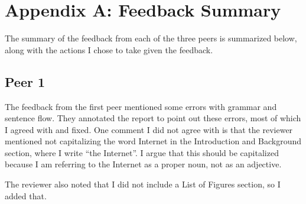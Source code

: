 \section*{Appendix A: Feedback Summary}
The summary of the feedback from each of the three peers is summarized below, along with the actions I chose to take given the feedback.

\subsection*{Peer 1}
The feedback from the first peer mentioned some errors with grammar and sentence flow.
They annotated the report to point out these errors, most of which I agreed with and fixed.
One comment I did not agree with is that the reviewer mentioned not capitalizing the word Internet in the Introduction and Background section, where I write ``the Internet''.
I argue that this should be capitalized because I am referring to the Internet as a proper noun, not as an adjective.

The reviewer also noted that I did not include a List of Figures section, so I added that.
